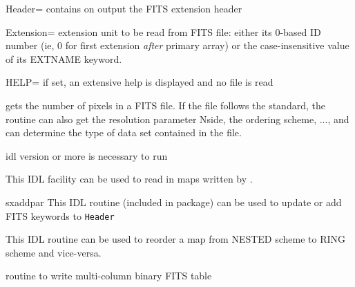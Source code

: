 \begin{qualifiers}
\begin{qulistwide}{}
	\item[{Header=}]   contains on output the FITS extension header
		
       \item[{Extension=}] 
	extension unit to be read from FITS file: 
 either its 0-based ID number (ie, 0 for first extension {\em after} primary array) 
 or the case-insensitive value of its EXTNAME keyword.

  \end{qulistwide}
\end{qualifiers}

\begin{keywords}
  \begin{kwlist}{} %
   \item[{HELP=}]   if set, an extensive help is displayed and no
	file is read
   \end{kwlist}
\end{keywords}

\begin{codedescription}
{\facname gets the number of pixels in a FITS file. If the file
follows the \healpix standard, the routine can also get the resolution
parameter Nside, the ordering scheme, ..., and can determine the type
of data set contained in the file.}
\end{codedescription}



\begin{related}
  \begin{sulist}{} %
  \item[idl] version \idlversion or more is necessary to run \facname
  \item[\htmlref{read\_fits\_map}{idl:read_fits_map}] This \healpix IDL facility can be used to read in maps
  written by \facname.
  \item[sxaddpar] This IDL routine (included in \healpix package) can be used to update
  or add FITS keywords to {\tt Header}
  \item[\htmlref{reorder}{idl:reorder}] This \healpix IDL routine can be used to reorder a map from
  NESTED scheme to RING scheme and vice-versa.
  \item[\htmlref{write\_fits\_sb}{idl:write_fits_sb}] routine to write multi-column binary FITS table
  \end{sulist}
\end{related}


